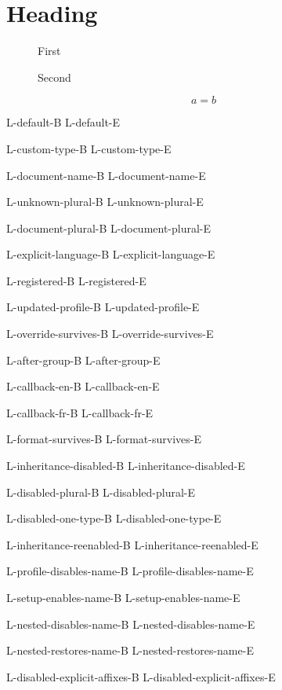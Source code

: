 \documentclass{article}
\newcounter{widget}
\newcommand\LangCase[2]{\par\noindent L-#1-B #2 L-#1-E\par}
\begin{document}
\section{Heading}\label{s}
\begin{figure}[htbp]\caption{First}\label{a}\end{figure}
\begin{figure}[htbp]\caption{Second}\label{b}\end{figure}
\begin{table}[htbp]\caption{Table}\label{t}\end{table}
\begin{equation}a=b\label{e}\end{equation}
\label{w}
\clearpage
\LangCase{default}{}
\LangCase{custom-type}{}
{\renewcommand\figurename{Picture}
 \LangCase{document-name}{}
 \LangCase{unknown-plural}{}
 \LangCase{document-plural}{}
 \LangCase{explicit-language}{}}
{
 \LangCase{registered}{}
 \LangCase{updated-profile}{}}
{
 \LangCase{override-survives}{}}
\LangCase{after-group}{}
{\def\CurrentDocumentLang{en}
 \wiserefsetup{lang={\CurrentDocumentLang}}
 \LangCase{callback-en}{}
 \def\CurrentDocumentLang{fr}
 \LangCase{callback-fr}{}}
{
 \LangCase{format-survives}{}}
{
 \renewcommand\figurename{Picture}
 \LangCase{inheritance-disabled}{}
 \LangCase{disabled-plural}{}
 \renewcommand\tablename{Data}
 \LangCase{disabled-one-type}{}
 \LangCase{inheritance-reenabled}{}}
{\renewcommand\figurename{Picture}
 \LangCase{profile-disables-name}{}
 \LangCase{setup-enables-name}{}
 {
  \LangCase{nested-disables-name}{}}
 \LangCase{nested-restores-name}{\wref{a}}}
{
 \renewcommand\figurename{Picture}
 \LangCase{disabled-explicit-affixes}{}}
\end{document}
